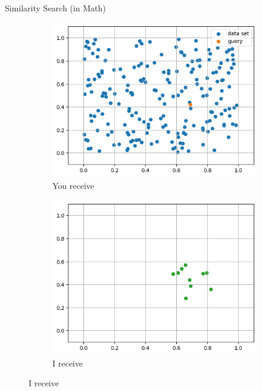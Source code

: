 \begin{frame}{Similarity Search (in Math)}
    \begin{figure}[ht]
        \centering
        \caption*{Trade offer}
        \hfill
        \begin{subfigure}{0.45\textwidth}
            \caption*{You receive}
            \includegraphics[width=\textwidth]{images/sim-search-init.png}
        \end{subfigure}
        \hfill
        \begin{subfigure}{0.45\textwidth}
            \caption*{I receive}
            \includegraphics[width=\textwidth]{images/sim-search-knn.png}
        \end{subfigure}
        \hfill
    \end{figure}
\end{frame}

